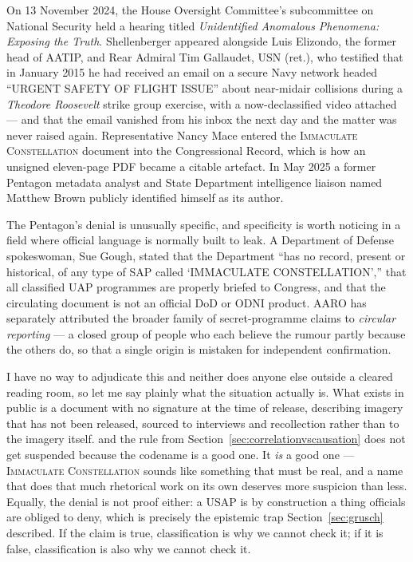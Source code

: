 On 13 November 2024, the House Oversight Committee's subcommittee on National Security held a hearing
titled \emph{Unidentified Anomalous Phenomena: Exposing the Truth}. Shellenberger appeared alongside
Luis Elizondo, the former head of AATIP, and Rear Admiral Tim Gallaudet, USN (ret.), who testified that
in January 2015 he had received an email on a secure Navy network headed ``URGENT SAFETY OF FLIGHT
ISSUE'' about near-midair collisions during a \emph{Theodore Roosevelt} strike group exercise, with a
now-declassified video attached --- and that the email vanished from his inbox the next day and the
matter was never raised again. Representative Nancy Mace entered the \textsc{Immaculate Constellation}
document into the Congressional Record, which is how an unsigned eleven-page PDF became a citable
artefact. In May 2025 a former Pentagon metadata analyst and State Department intelligence liaison named
Matthew Brown publicly identified himself as its author.

The Pentagon's denial is unusually specific, and specificity is worth noticing in a field where official
language is normally built to leak. A Department of Defense spokeswoman, Sue Gough, stated that the
Department ``has no record, present or historical, of any type of SAP called `IMMACULATE
CONSTELLATION','' that all classified UAP programmes are properly briefed to Congress, and that the
circulating document is not an official DoD or ODNI product. AARO has separately attributed the broader
family of secret-programme claims to \emph{circular reporting} --- a closed group of people who each
believe the rumour partly because the others do, so that a single origin is mistaken for independent
confirmation.

I have no way to adjudicate this and neither does anyone else outside a cleared reading room, so let me
say plainly what the situation actually is. What exists in public is a document with no signature at the
time of release, describing imagery that has not been released, sourced to interviews and recollection
rather than to the imagery itself.  and the rule from Section~\ref{sec:correlationvscausation} does not get suspended because the codename is a
good one. It \emph{is} a good one --- \textsc{Immaculate Constellation} sounds like something that must
be real, and a name that does that much rhetorical work on its own deserves more suspicion than less.
Equally, the denial is not proof either: a USAP is by construction a thing officials are obliged to deny,
which is precisely the epistemic trap Section~\ref{sec:grusch} described. If the claim is true, classification is why
we cannot check it; if it is false, classification is also why we cannot check it.

